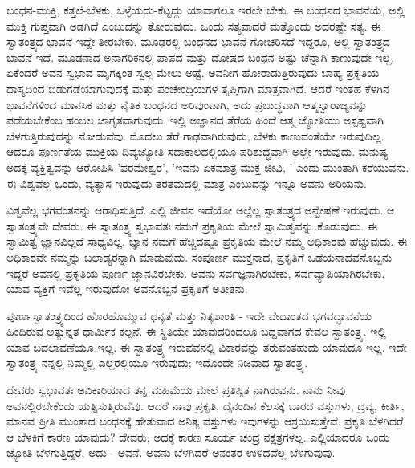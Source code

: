 ಬಂಧನ-ಮುಕ್ತಿ, ಕತ್ತಲೆ-ಬೆಳಕು, ಒಳ್ಳೆಯದು-ಕೆಟ್ಟದ್ದು ಯಾವಾಗಲೂ ಇರಲೇ ಬೇಕು. ಈ ಬಂಧನದ ಭಾವನೆಯೆ, ಅಲ್ಲಿ ಮುಕ್ತಿ ಗುಪ್ತವಾಗಿ ಅಡಗಿದೆ ಎಂಬುದನ್ನು ತೋರುವುದು. ಒಂದು ಸತ್ಯವಾದರೆ ಮತ್ತೊಂದು ಅದರಷ್ಟೇ ಸತ್ಯ. ಈ ಸ್ವಾತಂತ್ರ್ಯದ ಭಾವನೆ ಇದ್ದೇ ತೀರಬೇಕು. ಮೂಢರಲ್ಲಿ ಬಂಧನದ ಭಾವನೆ ಗೋಚರಿಸದೆ ಇದ್ದರೂ, ಅಲ್ಲಿ ಸ್ವಾತಂತ್ರ್ಯದ ಭಾವನೆ ಇದೆ. ಮೂಢನಾದ ಅನಾಗರಿಕನಲ್ಲಿ ಪಾಪದ ಮತ್ತು ದೋಷದ ಬಂಧನ ಅಷ್ಟು ಚೆನ್ನಾಗಿ ಕಾಣುವುದೇ ಇಲ್ಲ. ಏಕೆಂದರೆ ಅವನ ಸ್ವಭಾವ ಮೃಗಕ್ಕಿಂತ ಸ್ವಲ್ಪ ಮೇಲು ಅಷ್ಟೆ. ಅವನೀಗ ಹೋರಾಡುತ್ತಿರುವುದು ಬಾಹ್ಯ ಪ್ರಕೃತಿಯ ದಾಸ್ಯದಿಂದ ಬಿಡುಗಡೆಯಾಗುವುದಕ್ಕೆ ಮತ್ತು ಪಂಚೇಂದ್ರಿಯಗಳ ತೃಪ್ತಿಗಾಗಿ ಮಾತ್ರವಾಗಿದೆ. ಆದರೆ ಇಂತಹ ಕೆಳಗಿನ ಭಾವನೆಗಳಿಂದ ಮಾನಸಿಕ ಮತ್ತು ನೈತಿಕ ಬಂಧನದ ಅರಿವುಂಟಾಗಿ, ಅದು ಪ್ರಬುದ್ಧವಾಗಿ ಆತ್ಮಸ್ವಾರಾಜ್ಯವನ್ನು ಪಡೆಯಬೇಕೆಂಬ ಹಂಬಲ ಜಾಗೃತವಾಗುವುದು. ಇಲ್ಲಿ ಅಜ್ಞಾನದ ತೆರೆಯ ಹಿಂದೆ ಆತ್ಮ ಜ್ಯೋತಿಯು ಅಸ್ಪಷ್ಟವಾಗಿ ಬೆಳಗುತ್ತಿರುವುದನ್ನು ನೋಡುವೆವು. ಮೊದಲು ತೆರೆ ಗಾಢವಾಗಿರುವುದು, ಬೆಳಕು ಕಾಣುವಂತೆಯೇ ಇರುವುದಿಲ್ಲ. ಆದರೂ ಪೂರ್ಣತೆಯ ಮುಕ್ತಿಯ ದಿವ್ಯಜ್ಯೋತಿ ಸದಾಕಾಲದಲ್ಲಿಯೂ ಪರಿಶುದ್ಧವಾಗಿ ಅಲ್ಲೇ ಇರುವುದು. ಮನುಷ್ಯ ಅದಕ್ಕೆ ವ್ಯಕ್ತಿತ್ವವನ್ನು ಆರೋಪಿಸಿ 'ಪರಮೇಶ್ವರ', 'ಇವನು ಏಕಮಾತ್ರ ಮುಕ್ತ ಜೀವಿ, ' ಎಂದು ಮುಂತಾಗಿ ಕರೆಯುವನು. ಈ ವಿಶ್ವವೆಲ್ಲ ಒಂದು, ವ್ಯತ್ಯಾಸ ಇರುವುದು ತರತಮದಲ್ಲಿ ಮಾತ್ರ ಎಂಬುದನ್ನು ಇನ್ನೂ ಅವನು ಅರಿಯನು.

ವಿಶ್ವವೆಲ್ಲ ಭಗವಂತನನ್ನು ಆರಾಧಿಸುತ್ತಿದೆ. ಎಲ್ಲಿ ಜೀವನ ಇದೆಯೋ ಅಲ್ಲೆಲ್ಲ ಸ್ವಾತಂತ್ರ್ಯದ ಅನ್ವೇಷಣೆ ಇರುವುದು. ಆ ಸ್ವಾತಂತ್ರ್ಯವೇ ದೇವರು. ಈ ಸ್ವಾತಂತ್ರ್ಯ ಸ್ವಭಾವತಃ ನಮಗೆ ಪ್ರಕೃತಿಯ ಮೇಲೆ ಸ್ವಾಮಿತ್ವವನ್ನು ಕೊಡುವುದು. ಈ ಸ್ವಾಮಿತ್ವ ಜ್ಞಾನವಿಲ್ಲದೆ ಸಾಧ್ಯವಿಲ್ಲ. ಜ್ಞಾನ ನಮಗೆ ಹೆಚ್ಚಿದಷ್ಟೂ ಪ್ರಕೃತಿಯ ಮೇಲೆ ನಮ್ಮ ಅಧಿಕಾರವು ಹೆಚ್ಚುವುದು. ಈ ಅಧಿಕಾರವೇ ನಮ್ಮನ್ನು ಬಲಾಡ್ಯರನ್ನಾಗಿ ಮಾಡುವುದು. ಸಂಪೂರ್ಣ ಮುಕ್ತನಾದ, ಪ್ರಕೃತಿಗೆ ಒಡೆಯನಾದವನೊಬ್ಬನು ಇದ್ದರೆ ಅವನಲ್ಲಿ ಪ್ರಕೃತಿಯ ಪೂರ್ಣ ಜ್ಞಾನವಿರಬೇಕು. ಅವನು ಸರ್ವಜ್ಞನಾಗಿರಬೇಕು, ಸರ್ವವ್ಯಾಪಿಯಾಗಿರಬೇಕು. ಯಾವ ವ್ಯಕ್ತಿಗೆ ಇವೆಲ್ಲ ಇರುವುದೋ ಅವನೊಬ್ಬನೆ ಪ್ರಕೃತಿಗೆ ಅತೀತನು.

ಪೂರ್ಣಸ್ವಾತಂತ್ರ್ಯದಿಂದ ಹೊರಹೊಮ್ಮುವ ಧನ್ಯತೆ ಮತ್ತು ನಿತ್ಯಶಾಂತಿ - ಇದೇ ವೇದಾಂತದ ಭಗವದ್ಭಾವನೆಯ ಹಿಂದಿರುವ ಅತ್ಯುನ್ನತ ಧಾರ್ಮಿಕ ಕಲ್ಪನೆ. ಈ ಸ್ಥಿತಿಯೇ ಯಾವುದರಿಂದಲೂ ಬದ್ದವಾಗದ ಕೇವಲ ಸ್ವಾತಂತ್ರ್ಯ. ಇಲ್ಲಿ ಯಾವ ಬದಲಾವಣೆಯೂ ಇಲ್ಲ. ಈ ಸ್ವಾತಂತ್ರ್ಯ ಇರುವವನಲ್ಲಿ ವಿಕಾರವನ್ನು ತರುವಂತಹುದು ಯಾವುದೂ ಇಲ್ಲ. ಇದೇ ಸ್ವಾತಂತ್ರ್ಯ ನನ್ನಲ್ಲಿ ನಿಮ್ಮಲ್ಲಿ ಎಲ್ಲರಲ್ಲಿಯೂ ಇರುವುದು; ಇದೊಂದೇ ನಿಜವಾದ ಸ್ವಾತಂತ್ರ್ಯ.

ದೇವರು ಸ್ವಭಾವತಃ ಅವಿಕಾರಿಯಾದ ತನ್ನ ಮಹಿಮೆಯ ಮೇಲೆ ಪ್ರತಿಷ್ಠಿತ ನಾಗಿರುವನು. ನಾನು ನೀವು ಅವನಲ್ಲಿರಬೇಕೆಂದು ಯತ್ನಿಸುತ್ತಿರುವೆವು. ಆದರೆ ನಾವು ಪ್ರಕೃತಿ, ದೈನಂದಿನ ಕೆಲಸಕ್ಕೆ ಬಾರದ ವಸ್ತುಗಳು, ದ್ರವ್ಯ, ಕೀರ್ತಿ, ಮಾನವ ಪ್ರೀತಿ ಮುಂತಾದ ಬಂಧನಕ್ಕೆ ಹೇತುವಾದ ಅನಿತ್ಯ ವಸ್ತುಗಳು ಇವುಗಳನ್ನು ಆಶ್ರಯಿಸುತ್ತೇವೆ. ಪ್ರಕೃತಿ ಬೆಳಗಿದರೆ ಆ ಬೆಳಕಿಗೆ ಕಾರಣ ಯಾವುದು? ದೇವರು; ಅದಕ್ಕೆ ಕಾರಣ ಸೂರ್ಯ ಚಂದ್ರ ನಕ್ಷತ್ರಗಳಲ್ಲ. ಎಲ್ಲಿಯಾದರೂ ಒಂದು ಜ್ಯೋತಿ ಬೆಳಗುತ್ತಿದ್ದರೆ, ಅದು - ಅವನೆ. ಅವನು ಬೆಳಗಿದರೆ ಅನಂತರ ಉಳಿದವೆಲ್ಲ ಬೆಳಗುವುವು.

